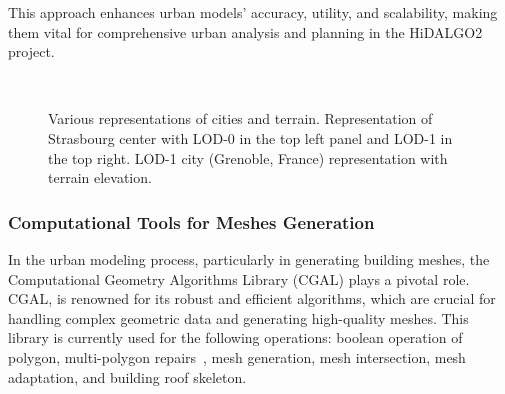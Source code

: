 \documentclass[runningheads]{llncs}
\begin{document}
This approach enhances urban models' accuracy, utility, and scalability, making them vital for comprehensive urban analysis and planning in the HiDALGO2 project.

\begin{figure}
\centering
{}
\hfill %
\\ %


\caption{Various representations of cities and terrain. Representation of Strasbourg center with LOD-0 in the top left panel and LOD-1 in the top right. LOD-1 city (Grenoble, France) representation with terrain elevation.}
\label{fig:city-strasbourg}
\end{figure}

\subsubsection{Computational Tools for Meshes Generation}

In the urban modeling process, particularly in generating building meshes, the Computational Geometry Algorithms Library (CGAL) plays a pivotal role. CGAL, \cite{the_cgal_project_cgal_2024} is renowned for its robust and efficient algorithms, which are crucial for handling complex geometric data and generating high-quality meshes. This library is currently used for the following operations: boolean operation of polygon, multi-polygon repairs~\cite{loriot_polygon_2024}, mesh generation, mesh intersection, mesh adaptation, and building roof skeleton.
\end{document}
